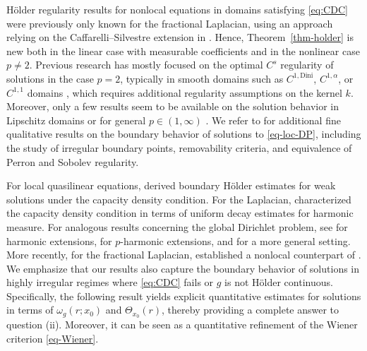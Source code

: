 \documentclass[11pt]{amsart}
\theoremstyle{plain}
\theoremstyle{definition}
\numberwithin{equation}{section}
\begin{document}
H\"older regularity results for nonlocal equations in domains satisfying \eqref{eq:CDC} were previously only known for the fractional Laplacian, using an approach relying on the Caffarelli--Silvestre extension in \cite{Li25}. Hence, Theorem~\ref{thm-holder} is new both in the linear case with measurable coefficients and in the nonlinear case $p \neq 2$. Previous research has mostly focused on the optimal $C^s$ regularity of solutions in the case $p = 2$, typically in smooth domains such as $C^{1,\text{Dini}}$, $C^{1,\alpha}$, or $C^{1,1}$ domains \cite{AFLY25,AbGr23,AbRo20,BGR10,BGR14,BKK25,CKS10,CKW22,ChSo98,ChSo25b,ChSo26,GKK20,Gru15,Gru24,Gru25,KiWe24,RoSe14,RoSe16,RoSe16b,RoSe17,RoWe24}, which requires additional regularity assumptions on the kernel $k$. Moreover, only a few results seem to be available on the solution behavior in Lipschitz domains \cite{BLN24,BoNo23,Bog00,Jak02,TTV18} or for general $p \in (1,\infty)$ \cite{Bjo24,BKK25b,IaMo24,IM26,IMS16,IMS20}. We refer to \cite{BBK24,BBK25,KiLe24,LiLi17,Pal26} for additional fine qualitative results on the boundary behavior of solutions to \eqref{eq-loc-DP}, including the study of irregular boundary points, removability criteria, and equivalence of Perron and Sobolev regularity.

For local quasilinear equations, \cite{GaZi77} derived boundary H\"older estimates for weak solutions under the capacity density condition. For the Laplacian, \cite{Anc86} characterized the capacity density condition in terms of uniform decay estimates for harmonic measure. For analogous results concerning the global Dirichlet problem, see \cite{Aik02} for harmonic extensions, \cite{AS06} for $p$-harmonic extensions, and \cite{CHMPZ25} for a more general setting. More recently, for the fractional Laplacian, \cite{Li25} established a nonlocal counterpart of \cite{Aik02}.\\

We emphasize that our results also capture the boundary behavior of solutions in highly irregular regimes where \eqref{eq:CDC} fails or $g$ is not H\"older continuous. 
Specifically, the following result yields explicit quantitative estimates for solutions in terms of $\omega_g(r;x_0)$ and $\Theta_{x_0}(r)$, thereby providing a complete answer to question (ii). Moreover, it can be seen as a quantitative refinement of the Wiener criterion \eqref{eq-Wiener}.
\end{document}
